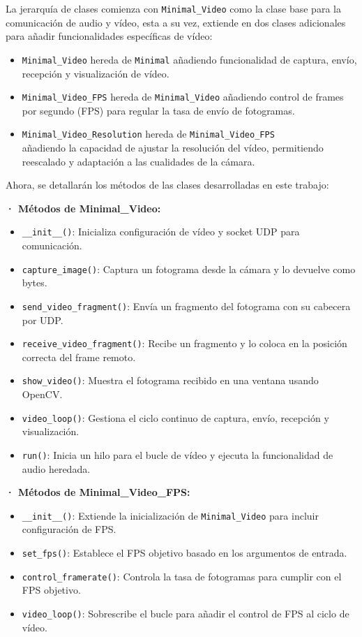 La jerarquía de clases comienza con \texttt{Minimal\_Video} como la clase base para la comunicación de audio y vídeo, esta a su vez, extiende en dos clases adicionales para añadir funcionalidades específicas de vídeo:
\begin{itemize} 
    \item \texttt{Minimal\_Video} hereda de \texttt{Minimal} añadiendo funcionalidad de captura, envío, recepción y visualización de vídeo. 
    \item \texttt{Minimal\_Video\_FPS} hereda de \texttt{Minimal\_Video} añadiendo control de frames por segundo (FPS) para regular la tasa de envío de fotogramas.
    \item \texttt{Minimal\_Video\_Resolution} hereda de \texttt{Minimal\_Video\_FPS} \\
    añadiendo la capacidad de ajustar la resolución del vídeo, permitiendo reescalado y adaptación a las cualidades de la cámara.
\end{itemize}

Ahora, se detallarán los métodos de las clases desarrolladas en este trabajo:
\vspace{\baselineskip}

\textbf{· Métodos de Minimal\_Video:} 
\begin{itemize} 
    \item \texttt{\_\_init\_\_()}: Inicializa configuración de vídeo y socket UDP para comunicación. 
    \item \texttt{capture\_image()}: Captura un fotograma desde la cámara y lo devuelve como bytes. 
    \item \texttt{send\_video\_fragment()}: Envía un fragmento del fotograma con su cabecera por UDP. 
    \item \texttt{receive\_video\_fragment()}: Recibe un fragmento y lo coloca en la posición correcta del frame remoto. 
    \item \texttt{show\_video()}: Muestra el fotograma recibido en una ventana usando OpenCV. 
    \item \texttt{video\_loop()}: Gestiona el ciclo continuo de captura, envío, recepción y visualización. 
    \item \texttt{run()}: Inicia un hilo para el bucle de vídeo y ejecuta la funcionalidad de audio heredada. 
\end{itemize}

\textbf{· Métodos de Minimal\_Video\_FPS:} 
\begin{itemize} 
    \item \texttt{\_\_init\_\_()}: Extiende la inicialización de \texttt{Minimal\_Video} para incluir configuración de FPS. 
    \item \texttt{set\_fps()}: Establece el FPS objetivo basado en los argumentos de entrada. 
    \item \texttt{control\_framerate()}: Controla la tasa de fotogramas para cumplir con el FPS objetivo.
    \item \texttt{video\_loop()}: Sobrescribe el bucle para añadir el control de FPS al ciclo de vídeo. 
\end{itemize}

